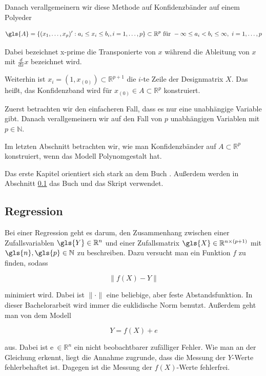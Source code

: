 \documentclass[12pt,a4paper]{article}
\theoremstyle{definition}
\theoremstyle{definition}
\theoremstyle{definition}
\theoremstyle{definition}
\begin{document}
Danach verallgemeinern wir diese Methode auf Konfidenzbänder auf einem Polyeder

\begin{equation*}
\gls{A} = \{(x_1, \ldots, x_p)' : a_i \leq x_i \leq b_i, i = 1, \ldots, p \} \subset \mathbb{R}^p \text{ für } - \infty \leq a_i < b_i \leq \infty,~ i=1, \ldots, p
\end{equation*}

Dabei bezeichnet \gls{x-prime} die Transponierte von $x$ während die Ableitung von $x$ mit $\frac{d}{dx}x$ bezeichnet wird. 

Weiterhin ist $x_i = (1, x_{(0)}) \subset \mathbb{R}^{p+1}$ die $i$-te Zeile der Designmatrix $X$. Das heißt, das Konfidenzband wird für $x_{(0)} \in A \subset \mathbb{R}^p$ konstruiert.

Zuerst betrachten wir den einfacheren Fall, dass es nur eine unabhängige Variable gibt. Danach verallgemeinern wir auf den Fall von $p$ unabhängigen Variablen mit $p \in \mathbb{N} $.

Im letzten Abschnitt betrachten wir, wie man Konfidenzbänder auf $A \subset \mathbb{R}^p$ konstruiert, wenn das Modell Polynomgestalt hat.

Das erste Kapitel orientiert sich stark an dem Buch \cite{Liu64}. Außerdem werden in Abschnitt \ref{Regression} das Buch \cite{Georgii09} und das Skript \cite{Kriv15} verwendet.


\subsection{Regression}
\label{Regression}
Bei einer Regression geht es darum, den Zusammenhang zwischen einer Zufallsvariablen $\gls{Y} \in \mathbb{R}^n$ und einer Zufallsmatrix $\gls{X} \in \mathbb{R}^{n \times (p+1)}$ mit $\gls{n}, \gls{p} \in \mathbb{N}$ zu beschreiben. Dazu versucht man ein Funktion $f$ zu finden, sodass

\begin{equation*}
\| f(X) - Y \|
\end{equation*}

minimiert wird. Dabei ist $ \| \cdot \|$ eine beliebige, aber feste Abstandsfunktion. In dieser Bachelorarbeit wird immer die euklidische Norm benutzt. Außerdem geht man von dem Modell

\begin{equation*}
Y = f(X) + e
\end{equation*}

aus. Dabei ist \gls{e}$ ~ \in \mathbb{R}^n$ ein nicht beobachtbarer zufälliger Fehler. Wie man an der Gleichung erkennt, liegt die Annahme zugrunde, dass die Messung der $Y$-Werte fehlerbehaftet ist.
Dagegen ist die Messung der $f(X)$-Werte fehlerfrei.
\end{document}
